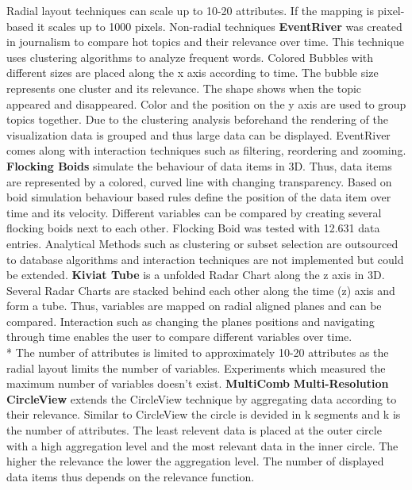 Radial layout techniques can scale up to 10-20 attributes. If the mapping is pixel-based it scales up to 1000 pixels\cite{Jayaraman2002}. 
Non-radial techniques
\textbf{EventRiver} was created in journalism to compare hot topics and their relevance over time. This technique uses clustering algorithms to analyze frequent words. Colored Bubbles with different sizes are placed along the x axis according to time. The bubble size represents one cluster and its relevance. The shape shows when the topic appeared and disappeared. Color and the position on the y axis are used to group topics together.
Due to the clustering analysis beforehand the rendering of the visualization data is grouped and thus large data can be displayed. 
EventRiver comes along with interaction techniques such as filtering, reordering and zooming.
\textbf{Flocking Boids} simulate the behaviour of data items in 3D. Thus, data items are represented by a colored, curved line with changing transparency. Based on boid simulation behaviour based rules define the position of the data item over time and its velocity. Different variables can be compared by creating several flocking boids next to each other. Flocking Boid was tested with 12.631 data entries\cite{Moere2004}. 
Analytical Methods such as clustering or subset selection are outsourced to database algorithms and interaction techniques are not implemented but could be extended\cite{Moere2004}.
\textbf{Kiviat Tube} is a unfolded Radar Chart along the z axis in 3D. Several Radar Charts are stacked behind each other along the time (z) axis and form a tube. Thus, variables are mapped on radial aligned planes and can be compared. Interaction such as changing the planes positions and navigating through time enables the user to compare different variables over time.\\*
The number of attributes is limited to approximately 10-20 attributes as the radial layout limits the number of variables. Experiments which measured the maximum number of variables doesn't exist. 
\textbf{MultiComb}
\textbf{Multi-Resolution CircleView} extends the CircleView technique by aggregating data according to their relevance. Similar to CircleView the circle is devided in k segments and k is the number of attributes. The least relevent data is placed at the outer circle with a high aggregation level and the most relevant data in the inner circle. The higher the relevance the lower the aggregation level. The number of displayed data items thus depends on the relevance function. 
